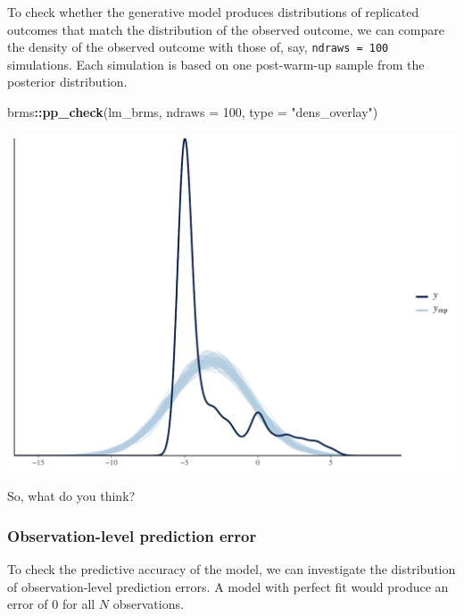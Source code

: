 \documentclass[
  11pt,
]{article}
\newenvironment{Shaded}{\begin{snugshade}}{\end{snugshade}}
\newcommand{\AttributeTok}[1]{\textcolor[rgb]{0.13,0.29,0.53}{#1}}
\newcommand{\DecValTok}[1]{\textcolor[rgb]{0.00,0.00,0.81}{#1}}
\newcommand{\FunctionTok}[1]{\textcolor[rgb]{0.13,0.29,0.53}{\textbf{#1}}}
\newcommand{\NormalTok}[1]{#1}
\newcommand{\SpecialCharTok}[1]{\textcolor[rgb]{0.81,0.36,0.00}{\textbf{#1}}}
\newcommand{\StringTok}[1]{\textcolor[rgb]{0.31,0.60,0.02}{#1}}
\begin{document}
To check whether the generative model produces distributions of replicated outcomes that match the distribution of the observed outcome, we can compare the density of the observed outcome with those of, say, \texttt{ndraws\ =\ 100} simulations. Each simulation is based on one post-warm-up sample from the posterior distribution.

\begin{Shaded}
\begin{Highlighting}[]
\NormalTok{brms}\SpecialCharTok{::}\FunctionTok{pp\_check}\NormalTok{(lm\_brms, }\AttributeTok{ndraws =} \DecValTok{100}\NormalTok{, }\AttributeTok{type =} \StringTok{"dens\_overlay"}\NormalTok{)}
\end{Highlighting}
\end{Shaded}

\begin{center}\includegraphics{02-02-lec_files/figure-latex/brms-lm-pp-1-1} \end{center}

So, what do you think?

\hypertarget{observation-level-prediction-error}{%
\subsubsection{Observation-level prediction error}\label{observation-level-prediction-error}}

To check the predictive accuracy of the model, we can investigate the distribution of observation-level prediction errors. A model with perfect fit would produce an error of \(0\) for all \(N\) observations.
\end{document}
